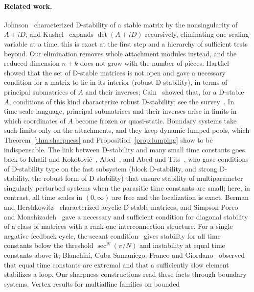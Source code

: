 \documentclass[11pt,a4paper]{article}
\theoremstyle{plain}
\theoremstyle{definition}
\theoremstyle{remark}
\begin{document}
\paragraph{Related work.} Johnson~\cite{johnson1975} characterized D-stability of a stable
matrix by the nonsingularity of $A\pm iD$, and Kushel~\cite{kushel2026} expands
$\det(A+iD)$ recursively, eliminating one scaling variable at a time; this is exact at the
first step and a hierarchy of sufficient tests beyond. Our elimination removes whole
attachment modules instead, and the reduced dimension $n+k$ does not grow with the number
of pieces. Hartfiel~\cite{hartfiel1980} showed that the set of D-stable matrices is not open
and gave a necessary condition for a matrix to lie in its interior (robust D-stability), in
terms of principal submatrices of $A$ and their inverses; Cain~\cite{cain1984} showed that,
for a D-stable $A$, conditions of this kind characterize robust D-stability; see the
survey~\cite{kushel2019}. In time-scale language, principal submatrices and their inverses
arise in limits in which coordinates of $A$ become frozen or quasi-static. Boundary systems take such limits only on the
attachments, and they keep dynamic lumped pools, which Theorem~\ref{thm:sharpness} and
Proposition~\ref{prop:lumping} show to be indispensable. The link between D-stability and
many small time constants goes back to Khalil and Kokotovi\'c~\cite{khalil1979},
Abed~\cite{abed1986tac,abed1986}, and Abed and Tits~\cite{abedtits1986}, who gave
conditions of D-stability type on the fast subsystem (block D-stability, and strong
D-stability, the robust form of D-stability) that ensure stability of multiparameter
singularly perturbed systems when the parasitic time constants are small; here, in contrast,
all time scales in $(0,\infty)$ are free and the localization is exact. Berman and
Hershkowitz~\cite{berman1984} characterized acyclic D-stable matrices, and Simpson-Porco and
Monshizadeh~\cite{simpsonporco2022} gave a necessary and sufficient condition for diagonal
stability of a class of matrices with a rank-one interconnection structure. For a single negative
feedback cycle, the secant condition~\cite{tyson1978,thron1991,sontag2006,arcak2006} gives
stability for all time constants below the threshold $\sec^N(\pi/N)$ and instability at
equal time constants above it; Blanchini, Cuba Samaniego, Franco and
Giordano~\cite{blanchini2018} observed that equal time constants are extremal and that a
sufficiently slow element stabilizes a loop. Our sharpness constructions read these facts
through boundary systems. Vertex results for multiaffine families on bounded
\end{document}
